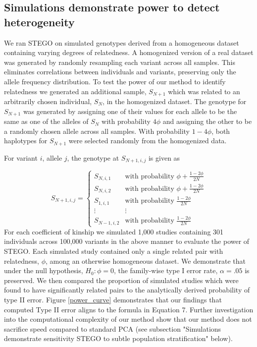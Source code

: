 \subsection{Simulations demonstrate power to detect heterogeneity}

We ran STEGO on simulated genotypes derived from a homogeneous dataset
containing varying degrees of relatedness. A homogenized version of
a real dataset was generated by randomly resampling each variant across
all samples. This eliminates correlations between individuals and
variants, preserving only the allele frequency distribution. To test
the power of our method to identify relatedness we generated an additional
sample, $S_{N+1}$ which was related to an arbitrarily chosen individual,
$S_{N}$, in the homogenized dataset. The genotype for $S_{N+1}$
was generated by assigning one of their values for each allele to
be the same as one of the alleles of $S_{N}$ with probability $4\phi$
and assigning the other to be a randomly chosen allele across all
samples. With probability $1-4\phi$, both haplotypes for $S_{N+1}$
were selected randomly from the homogenized data.

For variant $i$, allele $j$, the genotype at $S_{N+1,i,j}$ is given
as

\[ S_{N+1,i,j}=\begin{cases} S_{N,i,1} & \mbox{with probability }\phi+\frac{1-2\phi}{2N}\\ S_{N,i,2} & \mbox{with probability }\phi+\frac{1-2\phi}{2N}\\ S_{1,i,1} & \mbox{with probability }\frac{1-2\phi}{2N}\\ \vdots & \vdots\\ S_{N-1,i,2} & \mbox{with probability }\frac{1-2\phi}{2N} \end{cases} \] For
each coefficient of kinship we simulated 1,000 studies containing
301 individuals across 100,000 variants in the above manner to evaluate
the power of STEGO. Each simulated study contained only a single related
pair with relatedness, $\phi$, among an otherwise homogeneous dataset.
We demonstrate that under the null hypothesis, $H_{0}:\phi=0$, the
family-wise type I error rate, $\alpha=.05$ is preserved. We then
compared the proportion of simulated studies which were found to have
significantly related pairs to the analytically derived probability
of type II error. Figure \ref{power_curve} demonstrates that our findings
that computed Type II error aligns to the formula in Equation 7. Further
investigation into the computational complexity of our method show
that our method does not sacrifice speed compared to standard PCA
(see subsection "Simulations demonstrate sensitivity STEGO to subtle population stratification" below).


